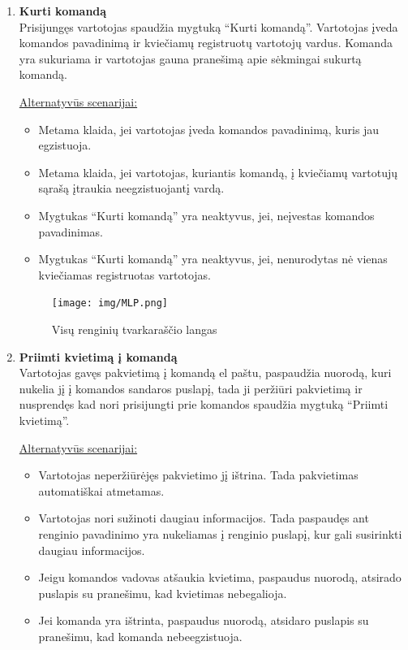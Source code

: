 \documentclass{VUMIFPSkursinis}
\begin{document}
\begin{enumerate} [label = \textbf{U\arabic*.}]
				\begin{figure}[H]
					\centering
					\texttt{[image: img/MLP.png]}
					\caption{Prašymo dalyvauti privačiame renginyje langas}
					\label{fig:prasymas-dalyvauti-privaciame-renginyje}
				\end{figure}
				
			\item \textbf{Kurti komandą} \\
				Prisijungęs vartotojas spaudžia mygtuką “Kurti komandą”. Vartotojas įveda komandos pavadinimą ir kviečiamų registruotų vartotojų vardus. Komanda yra sukuriama ir vartotojas gauna pranešimą apie sėkmingai sukurtą komandą.
			
				\underline{Alternatyvūs scenarijai:}
				\begin{itemize}
					\item Metama klaida, jei vartotojas įveda komandos pavadinimą, kuris jau egzistuoja.
					\item Metama klaida, jei vartotojas, kuriantis komandą, į kviečiamų vartotujų sąrašą įtraukia neegzistuojantį vardą.
					\item Mygtukas “Kurti komandą” yra neaktyvus, jei, neįvestas komandos pavadinimas.
					\item Mygtukas “Kurti komandą” yra neaktyvus, jei, nenurodytas nė vienas kviečiamas registruotas vartotojas.
				\end{itemize}

				\begin{figure}[H]
					\centering
					\texttt{[image: img/MLP.png]}
					\caption{Visų renginių tvarkaraščio langas}
					\label{fig:perziureti-renginiu-tvarkarasti}
				\end{figure}

			\item \textbf{Priimti kvietimą į komandą} \\
					Vartotojas gavęs pakvietimą į komandą el paštu, paspaudžia nuorodą, kuri nukelia jį į komandos sandaros puslapį, tada ji peržiūri pakvietimą ir nusprendęs kad nori prisijungti prie komandos spaudžia mygtuką “Priimti kvietimą”.

				\underline{Alternatyvūs scenarijai:}
				\begin{itemize}
					\item Vartotojas neperžiūrėjęs pakvietimo jį ištrina. Tada pakvietimas automatiškai atmetamas.
					\item Vartotojas nori sužinoti daugiau informacijos. Tada paspaudęs ant renginio pavadinimo yra nukeliamas į renginio puslapį, kur gali susirinkti daugiau informacijos.
					\item Jeigu komandos vadovas atšaukia kvietima, paspaudus nuorodą, atsirado puslapis su pranešimu, kad kvietimas nebegalioja.
					\item Jei komanda yra ištrinta, paspaudus nuorodą, atsidaro puslapis su pranešimu, kad komanda nebeegzistuoja.
				\end{itemize}


\end{enumerate}
\end{document}
